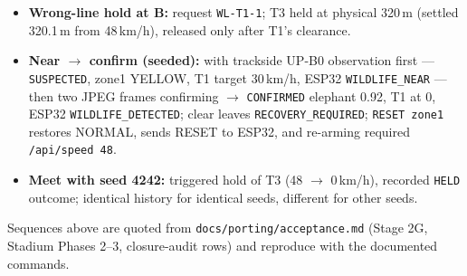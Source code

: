 \begin{itemize}
  \item \textbf{Wrong-line hold at B:} request \texttt{WL-T1-1}; T3 held at
        physical 320\,m (settled 320.1\,m from 48\,km/h), released only
        after T1's clearance.
  \item \textbf{Near $\rightarrow$ confirm (seeded):} with trackside UP-B0
        observation first --- \texttt{SUSPECTED}, zone1 YELLOW, T1 target
        30\,km/h, ESP32 \texttt{WILDLIFE\_NEAR} --- then two JPEG frames
        confirming $\rightarrow$ \texttt{CONFIRMED} elephant 0.92, T1 at
        0, ESP32 \texttt{WILDLIFE\_DETECTED}; clear leaves
        \texttt{RECOVERY\_REQUIRED}; \texttt{RESET zone1} restores NORMAL,
        sends RESET to ESP32, and re-arming required \texttt{/api/speed
        48}.
  \item \textbf{Meet with seed 4242:} triggered hold of T3 (48 $\rightarrow$
        0\,km/h), recorded \texttt{HELD} outcome; identical history for
        identical seeds, different for other seeds.
\end{itemize}

\noindent Sequences above are quoted from
\texttt{docs/porting/acceptance.md} (Stage 2G, Stadium Phases 2--3,
closure-audit rows) and reproduce with the documented commands.
